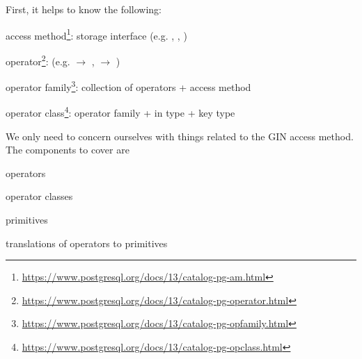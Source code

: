 First, it helps to know the following:

\begin{oparts}
\item
access method\footnote{%
  \url{https://www.postgresql.org/docs/13/catalog-pg-am.html}%
  }: storage interface (e.g. , , )
\item
operator\footnote{%
  \url{https://www.postgresql.org/docs/13/catalog-pg-operator.html}%
  }: (e.g.  $\rightarrow$ ,  $\rightarrow$ )
\item
operator family\footnote{%
  \url{https://www.postgresql.org/docs/13/catalog-pg-opfamily.html}%
  }: collection of operators + access method
\item
operator class\footnote{%
  \url{https://www.postgresql.org/docs/13/catalog-pg-opclass.html}%
  }: operator family + in type + key type
\end{oparts}

We only need to concern ourselves with things related to the GIN access method.
The components to cover are

\begin{nparts}
\item
operators
\item
operator classes
\item
primitives
\item
translations of operators to primitives
\end{nparts}
